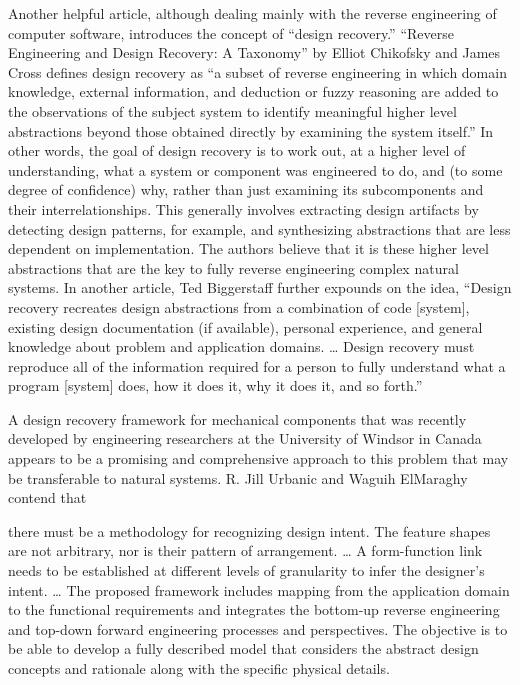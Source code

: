 Another helpful article, although dealing mainly with the reverse
engineering of computer software, introduces the concept of ``design
recovery.'' ``Reverse Engineering and Design Recovery: A Taxonomy'' by
Elliot Chikofsky and James Cross defines design recovery as ``a subset
of reverse engineering in which domain knowledge, external information,
and deduction or fuzzy reasoning are added to the observations of the
subject system to identify meaningful higher level abstractions beyond
those obtained directly by examining the system
itself.''\citep[][p.~15]{chikofskycross1990}
In other words, the goal of design
recovery is to work out, at a higher level of understanding, what a
system or component was engineered to do, and (to some degree of
confidence) why, rather than just examining its subcomponents and their
interrelationships. This generally involves extracting design
artifacts by detecting design patterns, for example, and synthesizing
abstractions that are less dependent on implementation. The authors
believe that it is these higher level abstractions that are the key to
fully reverse engineering complex natural systems. In another article,
Ted Biggerstaff further expounds on the idea, ``Design recovery
recreates design abstractions from a combination of code [system],
existing design documentation (if available), personal experience, and
general knowledge about problem and application domains. {\ldots} Design recovery
must reproduce all of the information required for a person to fully
understand what a program [system] does, how it does it, why it does
it, and so forth.''\citep[][p.~36]{biggerstaff1989}

A design recovery framework for mechanical components that was recently
developed by engineering researchers at the University of Windsor in
Canada appears to be a promising and comprehensive approach to this
problem that may be transferable to natural systems. R. Jill Urbanic
and Waguih ElMaraghy contend that 

\begin{quoting}
there must be a methodology for
recognizing design intent. The feature shapes are not arbitrary, nor is
their pattern of arrangement. {\ldots} A form-function link needs to be
established at different levels of granularity to infer the designer’s
intent. {\ldots} The proposed framework includes mapping from the application
domain to the functional requirements and integrates the bottom-up
reverse engineering and top-down forward engineering processes and
perspectives. The objective is to be able to develop a fully described
model that considers the abstract design concepts and rationale along
with the specific physical details. \citep{urbanicelmaraghy2009}
\end{quoting}

